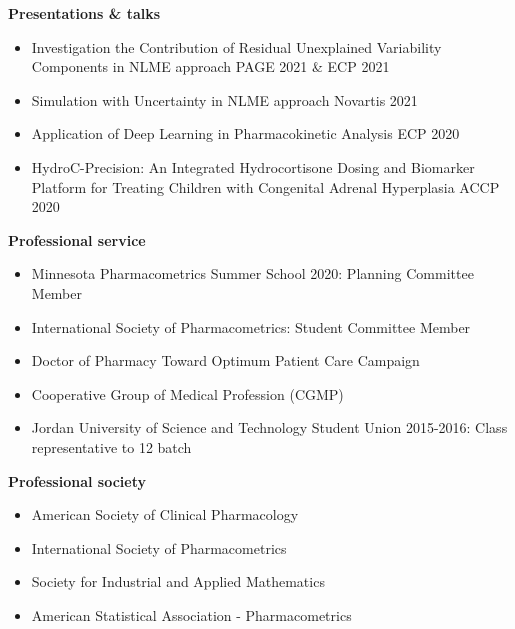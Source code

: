 \documentclass[a4paper,11pt]{article}
\begin{document}
\printbibliography[title=In preparation, keyword=ongoing]

\printbibliography[title=Posters \& abstracts,keyword=poster]
\newpage
{\centering\textbf{Presentations \& talks}}
\begin{itemize}
    \item Investigation the Contribution of Residual Unexplained Variability Components in NLME approach \hfill  PAGE 2021 \& ECP 2021
    \item Simulation with Uncertainty in NLME approach \hfill Novartis 2021 
    \item Application of Deep Learning in Pharmacokinetic Analysis \hfill ECP 2020 
    \item HydroC-Precision: An Integrated Hydrocortisone Dosing and Biomarker Platform for Treating Children with Congenital Adrenal Hyperplasia \hfill ACCP 2020
\end{itemize}
\textbf{Professional service}
\begin{itemize}
\item Minnesota Pharmacometrics Summer School 2020: Planning Committee Member 
\item International Society of Pharmacometrics: Student Committee Member 
\item Doctor of Pharmacy Toward Optimum Patient Care Campaign 
\item Cooperative Group of Medical Profession (CGMP) 
\item  Jordan University of Science and Technology Student Union 2015-2016: Class representative to 12 batch
\end{itemize}
\textbf{Professional society}
\begin{itemize}
    \item American Society of Clinical Pharmacology
    \item International Society of Pharmacometrics 
    \item Society for Industrial and Applied Mathematics 
    \item American Statistical Association - Pharmacometrics 
\end{itemize} 
\end{document}
